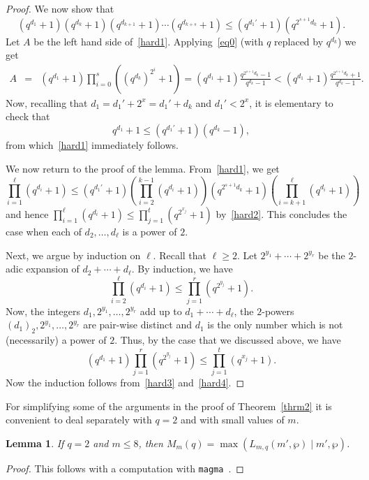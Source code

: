 \documentclass{amsart}
\newtheorem{lemma}[theorem]{Lemma}
\begin{document}
\begin{proof}
We now show that 
\begin{equation}\label{hard1}
(q^{d_1}+1)(q^{d_k}+1)(q^{d_{k+1}}+1)\cdots (q^{d_{k+s}}+1)\leq (q^{d_1'}+1)(q^{2^{s+1}d_k}+1).
\end{equation}
Let $A$ be the left hand side of~\eqref{hard1}. Applying~\eqref{eq0} (with $q$ replaced by $q^{d_k}$) we get
\begin{eqnarray*}
A&=&(q^{d_1}+1)\prod_{i=0}^s\left((q^{d_k})^{2^i}+1\right)=(q^{d_1}+1)\frac{q^{2^{s+1}d_k}-1}{q^{d_k}-1}<(q^{d_1}+1)\frac{q^{2^{s+1}d_k}+1}{q^{d_k}-1}.
\end{eqnarray*}
Now, recalling that $d_1=d_1'+2^x=d_1'+d_k$ and $d_1'<2^x$, it is elementary to check that 
$$q^{d_1}+1\leq (q^{d_1'}+1)(q^{d_k}-1),$$
from which~\eqref{hard1} immediately follows. 

We now return to the proof of the lemma. From~\eqref{hard1}, we get
$$\prod_{i=1}^\ell(q^{d_i}+1)\leq (q^{d_1'}+1)\left(\prod_{i=2}^{k-1}(q^{d_i}+1)\right)(q^{2^{s+1}d_k}+1)\left(\prod_{i=k+1}^\ell(q^{d_i}+1)\right)$$ 
and hence $\prod_{i=1}^\ell(q^{d_i}+1)\leq \prod_{j=1}^t(q^{2^{x_j}}+1)$ by~\eqref{hard2}. This concludes the case when each of $d_2,\ldots,d_\ell$ is a power of $2$.

Next, we argue by induction on $\ell$. Recall that $\ell\geq 2$. Let $2^{y_1}+\cdots +2^{y_r}$ be the $2$-adic expansion of $d_2+\cdots+d_\ell$. By induction, we have 
\begin{equation}\label{hard3}
\prod_{i=2}^\ell(q^{d_i}+1)\leq \prod_{j=1}^r(q^{2^{y_j}}+1).
\end{equation}
Now, the integers $d_1,2^{y_1},\ldots,2^{y_r}$ add up to $d_1+\cdots+d_\ell$, the $2$-powers $(d_1)_2,2^{y_1},\ldots,2^{y_r}$ are pair-wise distinct  and $d_1$ is the only number which is not (necessarily) a power of $2$. Thus, by the case that we discussed above, we have
\begin{equation}\label{hard4}
(q^{d_1}+1)\prod_{j=1}^r(q^{2^{y_j}}+1)\leq \prod_{j=1}^t(q^{x_j}+1).
\end{equation}
Now the induction follows from~\eqref{hard3} and~\eqref{hard4}. 
\end{proof}

For simplifying  some of the arguments in the proof of Theorem~\ref{thrm2} it is convenient to deal  separately with $q=2$ and with small values of $m$. 
\begin{lemma}\label{comp}
If $q=2$ and $m\leq 8$, then $M_m(q)=\max(L_{m,q}(m',\wp)\mid m',\wp)$.
\end{lemma}
\begin{proof}
This follows with a computation with \texttt{magma}~\cite{magma}.
\end{proof}
\end{document}
